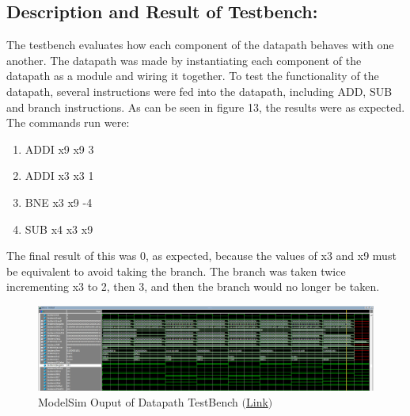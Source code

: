 \documentclass[10pt,letterpaper]{article}
\begin{document}
\subsection{Description and Result of Testbench:}
The testbench evaluates how each component of the datapath behaves with one another. The datapath was made by instantiating each component of the datapath as a module and wiring it together. To test the functionality of the datapath, several instructions were fed into the datapath, including ADD, SUB and branch instructions. As can be seen in figure 13, the results were as expected. The commands run were:
\begin{enumerate}
	\item ADDI x9 x9 3
	\item ADDI x3 x3 1
	\item BNE x3 x9 -4
	\item SUB x4 x3 x9 
\end{enumerate}
The final result of this was 0, as expected, because the values of x3 and x9 must be equivalent to avoid taking the branch. The branch was taken twice incrementing x3 to 2, then 3, and then the branch would no longer be taken.
\begin{figure}[H]
	\centering
	\includegraphics[width=\linewidth]{Figures/DatapathTB}
	\caption{ModelSim Ouput of Datapath TestBench \href{https://drive.google.com/file/d/12lNir8T4gr5fKlothDckKNEPZxD5jp_a/view?usp=sharing}{$($Link$)$}}
	\label{fig:datapathtb}
\end{figure}
\newpage
\end{document}
